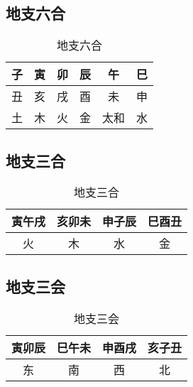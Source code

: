 \subsection{地支六合}
\begin{table}[H]
  \centering
  \caption[]{地支六合\footnotemark}
  \begin{tabular}{|c|c|c|c|c|c|}
    \hline 子 & 寅 & 卯 & 辰 & 午 & 巳 \\
    \hline 丑 & 亥 & 戌 & 酉 & 未 & 申 \\
    \hline 土 & 木 & 火 & 金 & 太和 & 水 \\
    \hline
  \end{tabular}
\end{table}


\subsection{地支三合}
\begin{table}[H]
  \centering
  \caption[]{地支三合\footnotemark}
  \begin{tabular}{|c|c|c|c|}
    \hline 寅午戌 & 亥卯未 & 申子辰 & 巳酉丑 \\
    \hline 火 & 木 & 水 & 金 \\
    \hline
  \end{tabular}
\end{table}

\subsection{地支三会}
\begin{table}[H]
  \centering
  \caption[]{地支三会\footnotemark}
  \begin{tabular}{|c|c|c|c|}
    \hline 寅卯辰 & 巳午未 & 申酉戌 & 亥子丑\\
    \hline 东 & 南 & 西 & 北 \\
    \hline
  \end{tabular}
\end{table}
